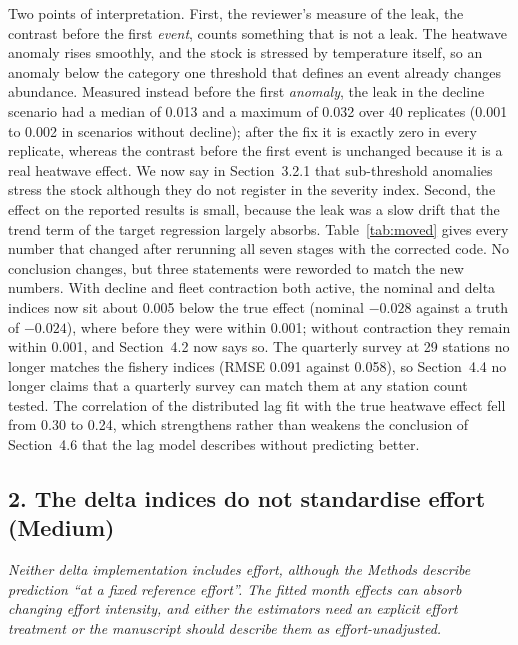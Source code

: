 \documentclass[11pt,a4paper]{article}
\newcommand{\rev}[1]{\par\medskip\noindent\textit{\color{black!60}#1}\par\smallskip}
\begin{document}
Two points of interpretation. First, the reviewer's measure of the leak, the contrast before the first \emph{event}, counts something that is not a leak. The heatwave anomaly rises smoothly, and the stock is stressed by temperature itself, so an anomaly below the category one threshold that defines an event already changes abundance. Measured instead before the first \emph{anomaly}, the leak in the decline scenario had a median of 0.013 and a maximum of 0.032 over 40 replicates (0.001 to 0.002 in scenarios without decline); after the fix it is exactly zero in every replicate, whereas the contrast before the first event is unchanged because it is a real heatwave effect. We now say in Section~3.2.1 that sub-threshold anomalies stress the stock although they do not register in the severity index. Second, the effect on the reported results is small, because the leak was a slow drift that the trend term of the target regression largely absorbs. Table~\ref{tab:moved} gives every number that changed after rerunning all seven stages with the corrected code. No conclusion changes, but three statements were reworded to match the new numbers. With decline and fleet contraction both active, the nominal and delta indices now sit about 0.005 below the true effect (nominal $-0.028$ against a truth of $-0.024$), where before they were within 0.001; without contraction they remain within 0.001, and Section~4.2 now says so. The quarterly survey at 29 stations no longer matches the fishery indices (RMSE 0.091 against 0.058), so Section~4.4 no longer claims that a quarterly survey can match them at any station count tested. The correlation of the distributed lag fit with the true heatwave effect fell from 0.30 to 0.24, which strengthens rather than weakens the conclusion of Section~4.6 that the lag model describes without predicting better.

\subsection*{2. The delta indices do not standardise effort (Medium)}

\rev{Neither delta implementation includes effort, although the Methods describe prediction ``at a fixed reference effort''. The fitted month effects can absorb changing effort intensity, and either the estimators need an explicit effort treatment or the manuscript should describe them as effort-unadjusted.}
\end{document}
